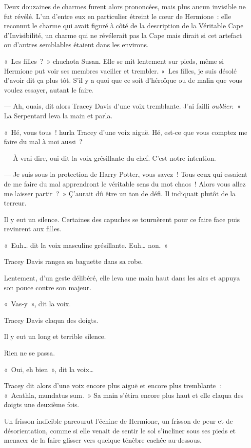 Deux douzaines de charmes furent alors prononcées, mais plus aucun invisible ne fut révélé. L'un d'entre eux en particulier étreint le cœur de Hermione~: elle reconnut le charme qui avait figuré à côté de la description de la Véritable Cape d'Invisibilité, un charme qui ne révélerait pas la Cape mais dirait si cet artefact ou d'autres semblables étaient dans les environs.

«~Les filles~?~» chuchota Susan. Elle se mit lentement sur pieds, même si Hermione put voir ses membres vaciller et trembler. «~Les filles, je suis désolé d'avoir dit ça plus tôt. S'il y a quoi que ce soit d'héroïque ou de malin que vous voulez essayer, autant le faire.

--- Ah, ouais, dit alors Tracey Davis d'une voix tremblante. J'ai failli \emph{oublier}.~» La Serpentard leva la main et parla.

«~Hé, vous tous~! hurla Tracey d'une voix aiguë. Hé, est-ce que vous comptez me faire du mal à moi aussi~?

--- À vrai dire, oui dit la voix grésillante du chef. C'est notre intention.

--- Je suis sous la protection de Harry Potter, vous savez~! Tous ceux qui essaient de me faire du mal apprendront le véritable sens du mot chaos~! Alors vous allez me laisser partir~?~» Ç'aurait dû être un ton de défi. Il indiquait plutôt de la terreur.

Il y eut un silence. Certaines des capuches se tournèrent pour ce faire face puis revinrent aux filles.

«~Euh… dit la voix masculine grésillante. Euh… non.~»

Tracey Davis rangea sa baguette dans sa robe.

Lentement, d'un geste délibéré, elle leva une main haut dans les airs et appuya son pouce contre son majeur.

«~Vas-y~», dit la voix.

Tracey Davis claqua des doigts.

Il y eut un long et terrible silence.

Rien ne se passa.

«~Oui, eh bien~», dit la voix…

Tracey dit alors d'une voix encore plus aiguë et encore plus tremblante~: «~Acathla, mundatus sum.~» Sa main s'étira encore plus haut et elle claqua des doigts une deuxième fois.

Un frisson indicible parcourut l'échine de Hermione, un frisson de peur et de désorientation, comme si elle venait de sentir le sol s'incliner sous ses pieds et menacer de la faire glisser vers quelque ténèbre cachée au-dessous.

